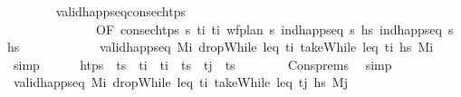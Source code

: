 \begin{isabellebody}
\ \ \ \ \ \ \isamarkupfalse%
\ valid{\isacharunderscore}{\kern0pt}happ{\isacharunderscore}{\kern0pt}seq{\isacharunderscore}{\kern0pt}consec{\isacharunderscore}{\kern0pt}htps\isanewline
\ \ \ \ \ \ \ \ \ \ \ \ \ \ {\isacharbrackleft}{\kern0pt}OF\ {\isacartoucheopen}consec{\isacharunderscore}{\kern0pt}htps\ {\isasympi}s\ t\isactrlsub i\ t\isactrlsub i{\isacharprime}{\kern0pt}{\isacartoucheclose}\ {\isacartoucheopen}wf{\isacharunderscore}{\kern0pt}plan\ {\isasympi}s{\isacartoucheclose}\ {\isacartoucheopen}ind{\isacharunderscore}{\kern0pt}happ{\isacharunderscore}{\kern0pt}seq\ {\isasympi}s\ hs\ {\isacartoucheopen}ind{\isacharunderscore}{\kern0pt}happ{\isacharunderscore}{\kern0pt}seq\ {\isasympi}s\ hs\isanewline
\ \ \ \ \ \ \ \ \ \ \ \ {\isacartoucheopen}valid{\isacharunderscore}{\kern0pt}happ{\isacharunderscore}{\kern0pt}seq\ M\isactrlsub i\ {\isacharparenleft}{\kern0pt}dropWhile\ {\isacharparenleft}{\kern0pt}leq\ t\isactrlsub i{\isacharparenright}{\kern0pt}\ {\isacharparenleft}{\kern0pt}takeWhile\ {\isacharparenleft}{\kern0pt}leq\ t\isactrlsub i{\isacharprime}{\kern0pt}{\isacharparenright}{\kern0pt}\ hs\ M\isactrlsub i{\isacharprime}{\kern0pt}{\isacartoucheclose}\ \isamarkupfalse%
\ simp\isanewline
\ \ \ \ \isamarkupfalse%
\ {\isachardoublequoteopen}htps\ {\isacharequal}{\kern0pt}\ {\isacharparenleft}{\kern0pt}ts\ {\isacharat}{\kern0pt}\ {\isacharbrackleft}{\kern0pt}t\isactrlsub i{\isacharbrackright}{\kern0pt}{\isacharparenright}{\kern0pt}\ {\isacharat}{\kern0pt}\ t\isactrlsub i{\isacharprime}{\kern0pt}\ {\isacharhash}{\kern0pt}\ ts\ {\isacharat}{\kern0pt}\ t\isactrlsub j\ {\isacharhash}{\kern0pt}\ ts\isanewline
\ \ \ \ \ \ \isamarkupfalse%
\ Cons{\isachardot}{\kern0pt}prems\ \isamarkupfalse%
\ simp\isanewline
\ \ \ \ \isamarkupfalse%
\ \isamarkupfalse%
\ {\isachardoublequoteopen}valid{\isacharunderscore}{\kern0pt}happ{\isacharunderscore}{\kern0pt}seq\ M\isactrlsub i{\isacharprime}{\kern0pt}\ {\isacharparenleft}{\kern0pt}dropWhile\ {\isacharparenleft}{\kern0pt}leq\ t\isactrlsub i{\isacharprime}{\kern0pt}{\isacharparenright}{\kern0pt}\ {\isacharparenleft}{\kern0pt}takeWhile\ {\isacharparenleft}{\kern0pt}leq\ t\isactrlsub j{\isacharparenright}{\kern0pt}\ hs\ M\isactrlsub j{\isachardoublequoteclose}\isanewline

\end{isabellebody}
